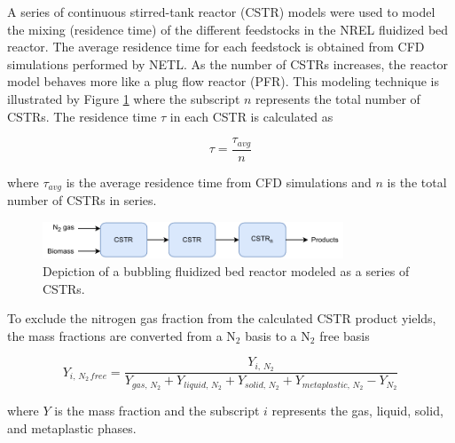 A series of continuous stirred-tank reactor (CSTR) models were used to model the mixing (residence time) of the different feedstocks in the NREL fluidized bed reactor. The average residence time for each feedstock is obtained from CFD simulations performed by NETL. As the number of CSTRs increases, the reactor model behaves more like a plug flow reactor (PFR). This modeling technique is illustrated by Figure \ref{fig:reactor-cstr-series} where the subscript $n$ represents the total number of CSTRs. The residence time $\tau$ in each CSTR is calculated as

\begin{equation}
    \tau = \frac{\tau_{avg}}{n}
\end{equation}

\noindent where $\tau_{avg}$ is the average residence time from CFD simulations and $n$ is the total number of CSTRs in series.

\begin{figure}[H]
    \centering
    \includegraphics[width=0.8\textwidth]{figures/reactor-cstr-series.pdf}
    \caption{Depiction of a bubbling fluidized bed reactor modeled as a series of CSTRs.}
    \label{fig:reactor-cstr-series}
\end{figure}

To exclude the nitrogen gas fraction from the calculated CSTR product yields, the mass fractions are converted from a N$_2$ basis to a N$_2$ free basis

\begin{equation}
    Y_{i,\,N_2\,free} = \frac{Y_{i,\,N_2}}{Y_{gas,\,N_2} + Y_{liquid,\,N_2} + Y_{solid,\,N_2} + Y_{metaplastic,\,N_2} - Y_{N_2}}
\end{equation}

\noindent where $Y$ is the mass fraction and the subscript $i$ represents the gas, liquid, solid, and metaplastic phases.

